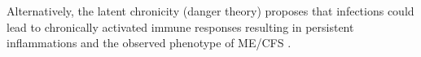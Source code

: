 Alternatively, the latent chronicity (danger theory) proposes that infections could lead to chronically activated immune responses resulting in persistent inflammations and the observed phenotype of ME/CFS \citep{sepulveda2019MyalgicEncephalomyelitis}.












